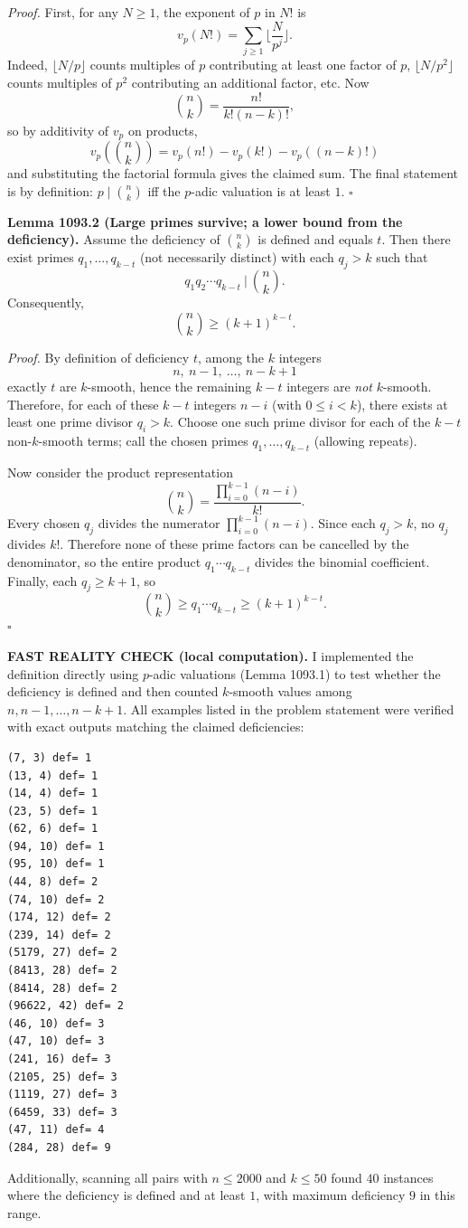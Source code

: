 \emph{Proof.}
First, for any $N\ge 1$, the exponent of $p$ in $N!$ is
\[v_p(N!)=\sum_{j\ge 1}\Big\lfloor\frac{N}{p^j}\Big\rfloor.
\]
Indeed, $\lfloor N/p\rfloor$ counts multiples of $p$ contributing at least one factor of $p$, $\lfloor N/p^2\rfloor$ counts multiples of $p^2$ contributing an additional factor, etc.
Now
\[\binom{n}{k}=\frac{n!}{k!(n-k)!},
\]
so by additivity of $v_p$ on products,
\[v_p\!\left(\binom{n}{k}\right)=v_p(n!)-v_p(k!)-v_p((n-k)!)
\]
and substituting the factorial formula gives the claimed sum.
The final statement is by definition: $p\mid \binom{n}{k}$ iff the $p$-adic valuation is at least $1$.
\hfill$\square$

\textbf{Lemma 1093.2 (Large primes survive; a lower bound from the deficiency).}
Assume the deficiency of $\binom{n}{k}$ is defined and equals $t$.
Then there exist primes $q_1,\dots,q_{k-t}$ (not necessarily distinct) with each $q_j>k$ such that
\[q_1q_2\cdots q_{k-t} \ \Big|\ \binom{n}{k}.
\]
Consequently,
\[\binom{n}{k}\ge (k+1)^{k-t}.
\]

\emph{Proof.}
By definition of deficiency $t$, among the $k$ integers
\[n,\ n-1,\ \dots,\ n-k+1
\]
exactly $t$ are $k$-smooth, hence the remaining $k-t$ integers are \emph{not} $k$-smooth.
Therefore, for each of these $k-t$ integers $n-i$ (with $0\le i<k$), there exists at least one prime divisor $q_i>k$.
Choose one such prime divisor for each of the $k-t$ non-$k$-smooth terms; call the chosen primes $q_1,\dots,q_{k-t}$ (allowing repeats).

Now consider the product representation
\[\binom{n}{k}=\frac{\prod_{i=0}^{k-1}(n-i)}{k!}.
\]
Every chosen $q_j$ divides the numerator $\prod_{i=0}^{k-1}(n-i)$.
Since each $q_j>k$, no $q_j$ divides $k!$.
Therefore none of these prime factors can be cancelled by the denominator, so the entire product $q_1\cdots q_{k-t}$ divides the binomial coefficient.
Finally, each $q_j\ge k+1$, so
\[\binom{n}{k}\ge q_1\cdots q_{k-t}\ge (k+1)^{k-t}.
\]
\hfill$\square$

\textbf{FAST REALITY CHECK (local computation).}
I implemented the definition directly using $p$-adic valuations (Lemma 1093.1) to test whether the deficiency is defined and then counted $k$-smooth values among $n,n-1,\dots,n-k+1$.
All examples listed in the problem statement were verified with exact outputs matching the claimed deficiencies:
\begin{verbatim}
(7, 3) def= 1
(13, 4) def= 1
(14, 4) def= 1
(23, 5) def= 1
(62, 6) def= 1
(94, 10) def= 1
(95, 10) def= 1
(44, 8) def= 2
(74, 10) def= 2
(174, 12) def= 2
(239, 14) def= 2
(5179, 27) def= 2
(8413, 28) def= 2
(8414, 28) def= 2
(96622, 42) def= 2
(46, 10) def= 3
(47, 10) def= 3
(241, 16) def= 3
(2105, 25) def= 3
(1119, 27) def= 3
(6459, 33) def= 3
(47, 11) def= 4
(284, 28) def= 9
\end{verbatim}
Additionally, scanning all pairs with $n\le 2000$ and $k\le 50$ found $40$ instances where the deficiency is defined and at least $1$, with maximum deficiency $9$ in this range.

